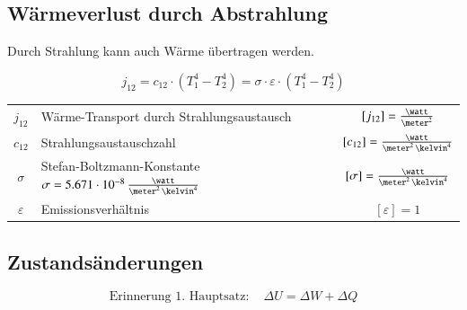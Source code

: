 \subsection{Wärmeverlust durch Abstrahlung}

Durch Strahlung kann auch Wärme übertragen werden.

$$ \boxed{ j_{12} = c_{12} \cdot (T_1^4 - T_2^4) = \sigma \cdot \varepsilon \cdot (T_1^4 - T_2^4) }   $$
\renewcommand{\arraystretch}{1.3}
\begin{tabular}{c l c}
	$j_{12}$ 		& Wärme-Transport durch Strahlungsaustausch 														& $[j_{12}] = \frac{\watt}{\meter^2}$ 				\\
	$c_{12}$ 		& Strahlungsaustauschzahl 																			& $[c_{12}] = \frac{\watt}{\meter^2 \, \kelvin^4}$ 	\\
	$\sigma$ 		& Stefan-Boltzmann-Konstante $\sigma = 5.671 \cdot 10^{-8} \, \frac{\watt}{\meter^2 \, \kelvin^4}$	& $[\sigma] = \frac{\watt}{\meter^2 \, \kelvin^4}$	\\
	$\varepsilon$ 	& Emissionsverhältnis 																				& $[\varepsilon] = 1$
\end{tabular}
\renewcommand{\arraystretch}{1}


\subsection{Zustandsänderungen}

\vspace{-0.2cm}

$$ \text{Erinnerung 1. Hauptsatz}: \quad  \Delta U = \Delta W + \Delta Q $$

